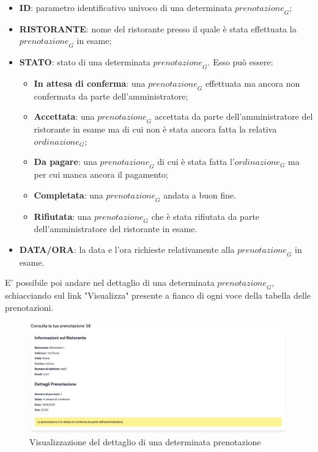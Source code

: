 \begin{itemize}
    \item \textbf{ID}: parametro identificativo univoco di una determinata $\textit{prenotazione}_G$;
    \item \textbf{RISTORANTE}: nome del ristorante presso il quale è stata effettuata la $\textit{prenotazione}_G$ in esame; 
    \item \textbf{STATO}: stato di una determinata $\textit{prenotazione}_G$. Esso può essere: 
    \begin{itemize}
        \item \textbf{In attesa di conferma}: una $\textit{prenotazione}_G$ effettuata ma ancora non confermata da parte dell'amministratore; 
        \item \textbf{Accettata}: una $\textit{prenotazione}_G$ accettata da parte dell'amministratore del ristorante in esame ma di cui non è stata ancora fatta la relativa $\textit{ordinazione}_G$; 
        \item \textbf{Da pagare}: una $\textit{prenotazione}_G$ di cui è stata fatta l'$\textit{ordinazione}_G$ ma per cui manca ancora il pagamento; 
        \item \textbf{Completata}: una $\textit{prenotazione}_G$ andata a buon fine.
        \item \textbf{Rifiutata}: una $\textit{prenotazione}_G$ che è stata rifiutata da parte dell'amministratore del ristorante in esame. 
    \end{itemize}
    \item \textbf{DATA/ORA}: la data e l'ora richieste relativamente alla $\textit{prenotazione}_G$ in esame. 
\end{itemize}
E' possibile poi andare nel dettaglio di una determinata $\textit{prenotazione}_G$, schiacciando sul link "Visualizza" presente a fianco di ogni voce della tabella delle prenotazioni. 
\begin{figure}[H]
    \centering
    \includegraphics[width=0.6\linewidth]{img/dettaglio_prenotazione_user.png}
    \caption{Visualizzazione del dettaglio di una determinata prenotazione}
\end{figure}

